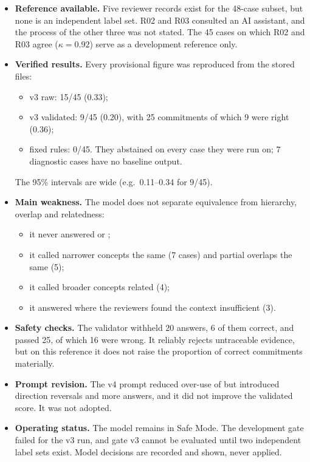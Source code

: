 \begin{itemize}
    \item \textbf{Reference available.} Five reviewer records exist for the 48-case subset, but none is an independent label set. R02 and R03 consulted an AI assistant, and the process of the other three was not stated. The 45 cases on which R02 and R03 agree ($\kappa=0.92$) serve as a development reference only.
    \item \textbf{Verified results.} Every provisional figure was reproduced from the stored files:
    \begin{itemize}
        \item v3 raw: 15/45 (0.33);
        \item v3 validated: 9/45 (0.20), with 25 commitments of which 9 were right (0.36);
        \item fixed rules: 0/45. They abstained on every case they were run on; 7 diagnostic cases have no baseline output.
    \end{itemize}
    The 95\% intervals are wide (e.g.\ 0.11--0.34 for 9/45).
    \item \textbf{Main weakness.} The model does not separate equivalence from hierarchy, overlap and relatedness:
    \begin{itemize}
        \item it never answered \PA{} or \CH;
        \item it called narrower concepts the same (7 cases) and partial overlaps the same (5);
        \item it called broader concepts related (4);
        \item it answered \UN{} where the reviewers found the context insufficient (3).
    \end{itemize}
    \item \textbf{Safety checks.} The validator withheld 20 answers, 6 of them correct, and passed 25, of which 16 were wrong. It reliably rejects untraceable evidence, but on this reference it does not raise the proportion of correct commitments materially.
    \item \textbf{Prompt revision.} The v4 prompt reduced over-use of \SC{} but introduced direction reversals and more \RE{} answers, and it did not improve the validated score. It was not adopted.
    \item \textbf{Operating status.} The model remains in Safe Mode. The development gate failed for the v3 run, and gate v3 cannot be evaluated until two independent label sets exist. Model decisions are recorded and shown, never applied.
\end{itemize}


